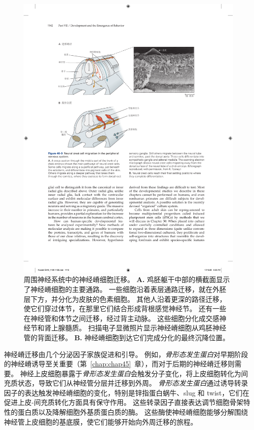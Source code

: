 \begin{figure}[htbp]
	\centering
	\includegraphics[width=1.0\linewidth]{chap46/fig_46_9}
	\caption{周围神经系统中的神经嵴细胞迁移。
		\textbf{A.} 鸡胚躯干中部的横截面显示了神经嵴细胞的主要通路。
		一些细胞沿着表层通路迁移，就在外胚层下方，并分化为皮肤的色素细胞。
		其他人沿着更深的路径迁移，使它们穿过体节，在那里它们结合形成背根感觉神经节。
		还有一些在神经管和体节之间迁移，经过背主动脉。
		这些细胞分化成交感神经节和肾上腺髓质。
		扫描电子显微照片显示神经嵴细胞从鸡胚神经管的背面迁移。
		\textbf{B.} 神经嵴细胞到达它们完成分化的最终沉降位置。}
	\label{fig:46_9}
\end{figure}


神经嵴迁移由几个分泌因子家族促进和引导。
例如，\textit{骨形态发生蛋白}对早期阶段的神经嵴诱导至关重要（第~\ref{chap:chap45}~章），而对于后期的神经嵴迁移则需要。
神经上皮细胞暴露于\textit{骨形态发生蛋白}会触发分子变化，将上皮细胞转化为间充质状态，导致它们从神经管分层并迁移到外周。
\textit{骨形态发生蛋白}通过诱导转录因子的表达触发神经嵴细胞的变化，特别是锌指蛋白蜗牛、slug 和 twist，它们在促进上皮-间充质转化方面具有保守作用。
这些转录因子直接表达调节细胞骨架特性的蛋白质以及降解细胞外基质蛋白质的酶。
这些酶使神经嵴细胞能够分解围绕神经管上皮细胞的基底膜，使它们能够开始向外周迁移的旅程。


